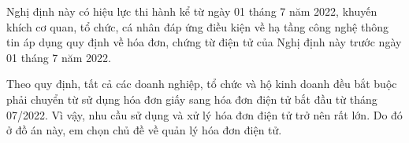 
Nghị định này có hiệu lực thi hành kể từ ngày 01 tháng 7 năm 2022, khuyến khích cơ quan, tổ chức, cá nhân đáp ứng điều kiện về hạ tầng công nghệ thông tin áp dụng quy định về hóa đơn, chứng từ điện tử của Nghị định này trước ngày 01 tháng 7 năm 2022.



Theo quy định, tất cả các doanh nghiệp, tổ chức và hộ kinh doanh đều bắt buộc phải chuyển từ sử dụng hóa đơn giấy sang hóa đơn điện tử bắt đầu từ tháng 07/2022. Vì vậy, nhu cầu sử dụng và xử lý hóa đơn điện tử trở nên rất lớn. Do đó ở đồ án này, em chọn chủ đề về quản lý hóa đơn điện tử.